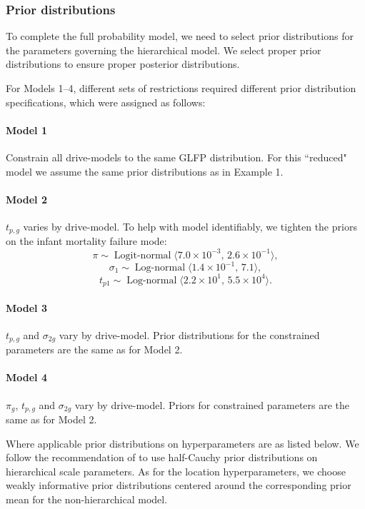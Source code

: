 \documentclass[12pt]{article}
\newcommand{\op}{\operatorname}
\begin{document}
\subsubsection{Prior distributions}
\label{sec:Prior distributions}
To complete the full probability model, we need to select prior distributions for the parameters governing the hierarchical model. We select proper prior distributions to ensure proper posterior distributions.

For Models 1--4, different sets of restrictions required different prior distribution specifications, which were assigned as follows:

\paragraph{Model 1} Constrain all drive-models to the same GLFP distribution. For this ``reduced" model we assume the same prior distributions as in Example 1.

\paragraph{Model 2} $t_{p,g}$ varies by drive-model. To help with model identifiably, we tighten the priors on the infant mortality failure mode:
$$ \pi \sim \op{Logit-normal}\langle 7.0\times 10^{-3},\, 2.6 \times 10^{-1} \rangle,$$
$$\sigma_1 \sim \op{Log-normal}\langle 1.4 \times 10^{-1},\, 7.1\rangle,$$ 
$$t_{p1} \sim \op{Log-normal} \langle 2.2 \times 10^1,\, 5.5 \times 10^{4} \rangle.$$

\paragraph{Model 3} $t_{p,g}$ and $\sigma_{2g}$ vary by drive-model. Prior distributions for the constrained parameters are the same as for Model 2.

\paragraph{Model 4} $\pi_g$, $t_{p,g}$ and $\sigma_{2g}$ vary by drive-model. Priors for constrained parameters are the same as for Model 2.


Where applicable prior distributions on hyperparameters are as listed below. We follow the recommendation of \citet{gelman2014bayesian} to use half-Cauchy prior distributions on hierarchical scale parameters. As for the location hyperparameters, we choose weakly informative prior distributions centered around the corresponding prior mean for the non-hierarchical model.
\end{document}
